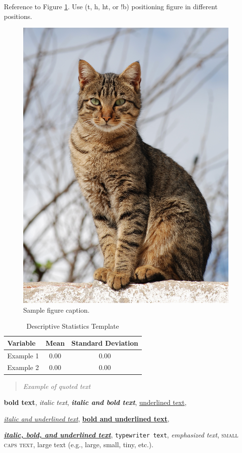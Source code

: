 \documentclass[12pt, onecolumn]{IEEEtran}
\begin{document}
Reference to Figure \ref{fig:statement}. Use (t, h, ht, or !b) positioning figure in different positions.


\begin{figure}[ht]
    \centering
    \includegraphics[width=0.5\linewidth, height=0.5\linewidth]{figures/sample.jpg}

    \caption{Sample figure caption.}
    \label{fig:statement}
\end{figure}



\begin{table}[ht]
    \caption{Descriptive Statistics Template}
    \centering
    \begin{tabular}{lcc}
        \hline
        Variable & Mean & Standard Deviation \\
        \hline
        Example 1 & 0.00 & 0.00 \\
        Example 2 & 0.00 & 0.00 \\
        \hline
    \end{tabular}
\end{table}


\begin{quote}
\textit{Example of quoted text}
\end{quote}

\textbf{bold text}, 
\textit{italic text}, 
\textbf{\textit{italic and bold text}}, 
\underline{underlined text}, 

\underline{\textit{italic and underlined text}}, 
\underline{\textbf{bold and underlined text}}, 

\underline{\textbf{\textit{italic, bold, and underlined text}}}, 
\texttt{typewriter text}, 
\emph{emphasized text}, 
\textsc{small caps text}, 
{\Large large text} (e.g., large, small, tiny, etc.).
\end{document}
